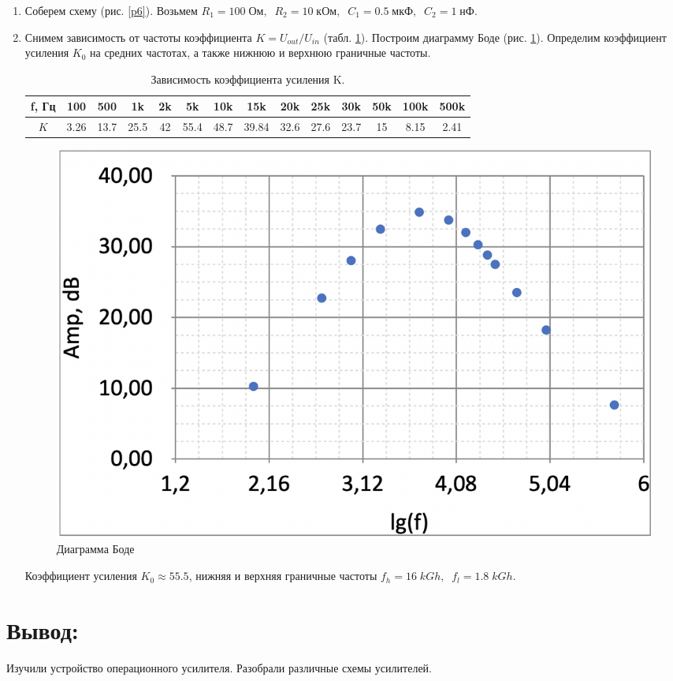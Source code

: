 \documentclass[a4paper]{article}
\begin{document}
\begin{enumerate}
    \item Соберем схему (рис. \ref{p6}). Возьмем $R_1 = 100\; Ом, \;\; R_2 = 10\; кОм, \;\; C_1 = 0.5\; мкФ, \;\; C_2 = 1\; нФ$.

    \item  Снимем зависимость от частоты коэффициента $K = U_{out}/U_{in}$ (табл. \ref{t7}). Построим диаграмму Боде (рис. \ref{last}). Определим коэффициент усиления $K_0$ на средних частотах, а также нижнюю и верхнюю граничные частоты.
    \begin{table}[H]
        \centering
        \begin{center}
        \end{center}
        \vspace{0.1cm}
        \begin{tabular}{|c|c|c|c|c|c|c|c|c|c|c|c|c|c|}
            \hline
            f, Гц  & 100  & 500 & 1k & 2k & 5k & 10k & 15k & 20k & 25k & 30k & 50k & 100k & 500k  \\ 
            \hline
            $K$   & 3.26 &  13.7 &  25.5 & 42 & 55.4 & 48.7 &  39.84 &  32.6 & 27.6 & 23.7 & 15 & 8.15 & 2.41 \\
            \hline
  
            \end{tabular}
            \caption{Зависимость коэффициента усиления K.}
            \label{t7}
    \end{table}

    \begin{figure}[H]
        \begin{center}
            \includegraphics[scale = 0.4]{last.png}
            \caption{Диаграмма Боде}
            \label{last}
        \end{center}
    \end{figure}

    Коэффициент усиления $K_0 \approx 55.5$, нижняя и верхняя граничные частоты $f_h = 16 \;kGh, \;\; f_l = 1.8 \; kGh.$

\end{enumerate}

\section{Вывод:}
Изучили устройство операционного усилителя. Разобрали различные схемы усилителей.
\end{document}
